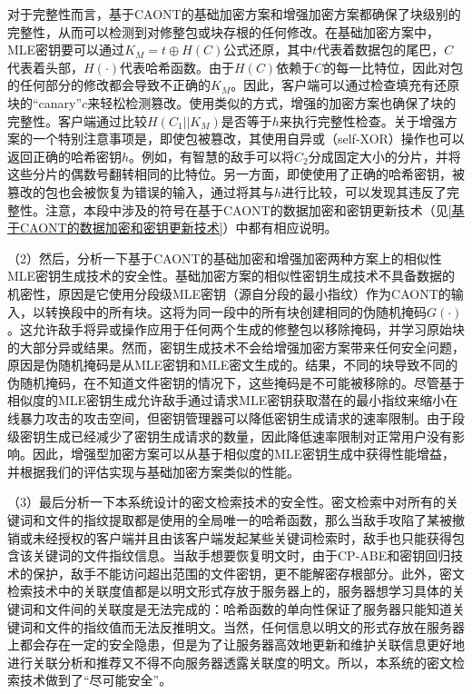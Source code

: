 \documentclass[promaster]{thesis-uestc}
\begin{document}
对于完整性而言，基于CAONT的基础加密方案和增强加密方案都确保了块级别的完整性，从而可以检测到对修整包或块存根的任何修改。在基础加密方案中，MLE密钥要可以通过$K_M = t \oplus H(C)$公式还原，其中$t$代表着数据包的尾巴，$C$代表着头部，$H(\cdot)$代表哈希函数。由于$H(C)$依赖于$C$的每一比特位，因此对包的任何部分的修改都会导致不正确的$K_M$。因此，客户端可以通过检查填充有还原块的“canary”$c$来轻松检测篡改。使用类似的方式，增强的加密方案也确保了块的完整性。客户端通过比较$H(C_1||K_M)$是否等于$h$来执行完整性检查。关于增强方案的一个特别注意事项是，即使包被篡改，其使用自异或（self-XOR）操作也可以返回正确的哈希密钥$h$。例如，有智慧的敌手可以将$C_2$分成固定大小的分片，并将这些分片的偶数号翻转相同的比特位。另一方面，即使使用了正确的哈希密钥，被篡改的包也会被恢复为错误的输入，通过将其与$h$进行比较，可以发现其违反了完整性。注意，本段中涉及的符号在基于CAONT的数据加密和密钥更新技术（见\ref{基于CAONT的数据加密和密钥更新技术}）中都有相应说明。

（2）然后，分析一下基于CAONT的基础加密和增强加密两种方案上的相似性MLE密钥生成技术的安全性。基础加密方案的相似性密钥生成技术不具备数据的机密性，原因是它使用分段级MLE密钥（源自分段的最小指纹）作为CAONT的输入，以转换段中的所有块。这将为同一段中的所有块创建相同的伪随机掩码$G(\cdot)$。这允许敌手将异或操作应用于任何两个生成的修整包以移除掩码，并学习原始块的大部分异或结果。然而，密钥生成技术不会给增强加密方案带来任何安全问题，原因是伪随机掩码是从MLE密钥和MLE密文生成的。结果，不同的块导致不同的伪随机掩码，在不知道文件密钥的情况下，这些掩码是不可能被移除的。尽管基于相似度的MLE密钥生成允许敌手通过请求MLE密钥获取潜在的最小指纹来缩小在线暴力攻击的攻击空间，但密钥管理器可以降低密钥生成请求的速率限制。由于段级密钥生成已经减少了密钥生成请求的数量，因此降低速率限制对正常用户没有影响。因此，增强型加密方案可以从基于相似度的MLE密钥生成中获得性能增益，并根据我们的评估实现与基础加密方案类似的性能。

（3）最后分析一下本系统设计的密文检索技术的安全性。密文检索中对所有的关键词和文件的指纹提取都是使用的全局唯一的哈希函数，那么当敌手攻陷了某被撤销或未经授权的客户端并且由该客户端发起某些关键词检索时，敌手也只能获得包含该关键词的文件指纹信息。当敌手想要恢复明文时，由于CP-ABE和密钥回归技术的保护，敌手不能访问超出范围的文件密钥，更不能解密存根部分。此外，密文检索技术中的关联度值都是以明文形式存放于服务器上的，服务器想学习具体的关键词和文件间的关联度是无法完成的：哈希函数的单向性保证了服务器只能知道关键词和文件的指纹值而无法反推明文。当然，任何信息以明文的形式存放在服务器上都会存在一定的安全隐患，但是为了让服务器高效地更新和维护关联信息更好地进行关联分析和推荐又不得不向服务器透露关联度的明文。所以，本系统的密文检索技术做到了“尽可能安全”。
\end{document}
